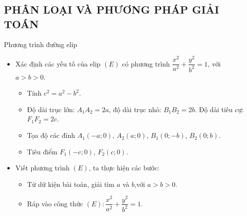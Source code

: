 \subsection{PHÂN LOẠI VÀ PHƯƠNG PHÁP GIẢI TOÁN}

\begin{dang}{Phương trình đường elip}
	\begin{itemize}
		\item [\iconMT] Xác định các yếu tố của elip $(E)$ có phương trình $\dfrac{x^2}{a^2}+\dfrac{y^2}{b^2}=1$, với $a>b>0$.
		\begin{itemize}
			\item Tính $c^2 = a^2 - b^2$.
			\item Độ dài trục lớn: $A_1 A_2 = 2a$, độ dài trục nhỏ: $B_1 B_2 = 2b$. Độ dài tiêu cự: $F_1 F_2 = 2c$.
			\item Tọa độ các đỉnh $A_1(-a;0)$, $A_2(a;0)$, $B_1(0;-b)$, $B_2(0;b)$.
			\item Tiêu điểm $F_1(-c;0)$,  $F_2(c;0)$.
		\end{itemize}
		\item [\iconMT] Viết phương trình $(E)$, ta thực hiện các bước:
		\begin{itemize}
			\item Từ dữ kiện bài toán, giải tìm $a$ và $b$,với $a>b>0$. 
			\item Ráp vào công thức $(E): \dfrac{x^{2}}{a^{2}}+\dfrac{y^{2}}{b^{2}}=1$.
		\end{itemize}
	\end{itemize}
\end{dang}

